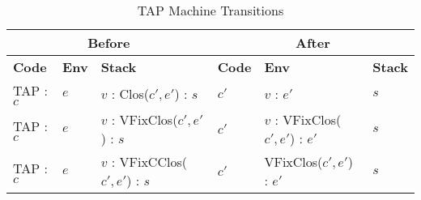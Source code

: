 \begin{table}[h]
    \centering
    \small
    \begin{tabular}{|l|l|l||l|l|l|}
        \hline
        \multicolumn{3}{|c||}{\textbf{Before}} & \multicolumn{3}{c|}{\textbf{After}} \\
        \hline
        \textbf{Code} & \textbf{Env} & \textbf{Stack} & \textbf{Code} & \textbf{Env} & \textbf{Stack} \\
        \hline
        TAP : \(c\) & \( e \) & \( v \) : Clos(\( c' , e' \)) : \( s \) & \( c' \) & \( v \) : \( e' \) & \( s \) \\
        TAP : \(c\) & \( e \) & \( v \) : VFixClos(\( c' , e' \)) : \( s \) & \( c' \) & \( v \) : VFixClos(\( c' , e' \)) : \( e' \) & \( s \) \\
        TAP : \(c\) & \( e \) & \( v \) : VFixCClos(\( c' , e' \)) : \( s \) & \( c' \) & VFixClos(\( c' , e' \)) : \( e' \) & \( s \) \\
        \hline
    \end{tabular}
    \caption{TAP Machine Transitions}
\end{table}

